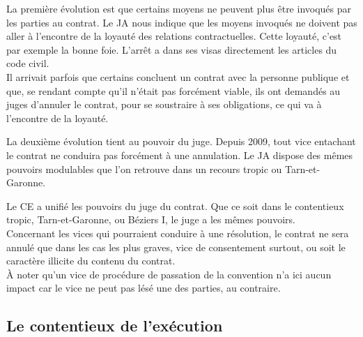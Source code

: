 \documentclass[10pt, a4paper, openany]{book}
\begin{document}
La première évolution est que certains moyens ne peuvent plus être invoqués par les parties au contrat. Le JA nous indique que les moyens invoqués ne doivent pas aller à l'encontre de la loyauté des relations contractuelles. Cette loyauté, c'est par exemple la bonne foie. L'arrêt a dans ses visas directement les articles du code civil. \\
Il arrivait parfois que certains concluent un contrat avec la personne publique et que, se rendant compte qu'il n'était pas forcément viable, ils ont demandés au juges d'annuler le contrat, pour se soustraire à ses obligations, ce qui va à l'encontre de la loyauté. 


La deuxième évolution tient au pouvoir du juge. Depuis 2009, tout vice entachant le contrat ne conduira pas forcément à une annulation. Le JA dispose des mêmes pouvoirs modulables que l'on retrouve dans un recours tropic ou Tarn-et-Garonne.


Le CE a unifié les pouvoirs du juge du contrat. Que ce soit dans le contentieux tropic, Tarn-et-Garonne, ou Béziers I, le juge a les mêmes pouvoirs. \\
Concernant les vices qui pourraient conduire à une résolution, le contrat ne sera annulé que dans les cas les plus graves, vice de consentement surtout, ou soit le caractère illicite du contenu du contrat. \\
À noter qu'un vice de procédure de passation de la convention n'a ici aucun impact car le vice ne peut pas lésé une des parties, au contraire. 

\subsection{Le contentieux de l'exécution}
\end{document}
